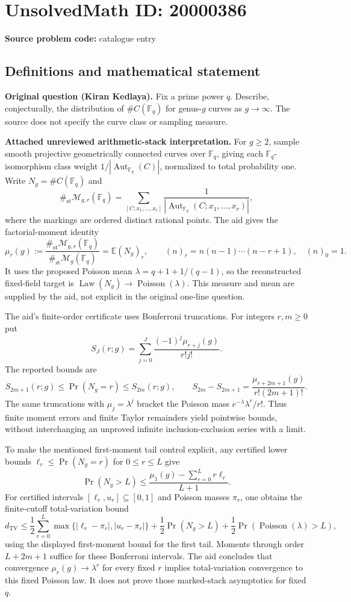\documentclass[11pt]{article}
\newcommand{\F}{\mathbb{F}}
\newcommand{\E}{\mathbb{E}}
\begin{document}
\section*{UnsolvedMath ID: 20000386}
\textbf{Source problem code:} catalogue entry
\subsection{Definitions and mathematical statement}
\textbf{Original question (Kiran Kedlaya).} Fix a prime power $q$. Describe, conjecturally, the distribution of $\#C(\F_q)$ for genus-$g$ curves as $g\to\infty$. The source does not specify the curve class or sampling measure.

\textbf{Attached unreviewed arithmetic-stack interpretation.} For $g\ge2$, sample smooth projective geometrically connected curves over $\F_q$, giving each $\F_q$-isomorphism class weight $1/|\operatorname{Aut}_{\F_q}(C)|$, normalized to total probability one. Write $N_g=\#C(\F_q)$ and
\[\#_{\mathrm{st}}\mathcal M_{g,r}(\F_q)=\sum_{[C;x_1,\ldots,x_r]}\frac1{|\operatorname{Aut}_{\F_q}(C;x_1,\ldots,x_r)|},\]
where the markings are ordered distinct rational points. The aid gives the factorial-moment identity
\[\mu_r(g):=\frac{\#_{\mathrm{st}}\mathcal M_{g,r}(\F_q)}{\#_{\mathrm{st}}\mathcal M_g(\F_q)}=\E (N_g)_r,\qquad (n)_r=n(n-1)\cdots(n-r+1),\quad(n)_0=1.\]
It uses the proposed Poisson mean $\lambda=q+1+1/(q-1)$, so the reconstructed fixed-field target is $\operatorname{Law}(N_g)\to\operatorname{Poisson}(\lambda)$. This measure and mean are supplied by the aid, not explicit in the original one-line question.

The aid's finite-order certificate uses Bonferroni truncations. For integers $r,m\ge0$ put
\[S_J(r;g)=\sum_{j=0}^J\frac{(-1)^j\mu_{r+j}(g)}{r!j!}.\]
The reported bounds are
\[S_{2m+1}(r;g)\le\Pr(N_g=r)\le S_{2m}(r;g),\qquad S_{2m}-S_{2m+1}=\frac{\mu_{r+2m+1}(g)}{r!(2m+1)!}.\]
The same truncations with $\mu_j=\lambda^j$ bracket the Poisson mass $e^{-\lambda}\lambda^r/r!$. Thus finite moment errors and finite Taylor remainders yield pointwise bounds, without interchanging an unproved infinite inclusion-exclusion series with a limit.

To make the mentioned first-moment tail control explicit, any certified lower bounds $\ell_r\le\Pr(N_g=r)$ for $0\le r\le L$ give
\[\Pr(N_g>L)\le\frac{\mu_1(g)-\sum_{r=0}^Lr\ell_r}{L+1}.\]
For certified intervals $[\ell_r,u_r]\subseteq[0,1]$ and Poisson masses $\pi_r$, one obtains the finite-cutoff total-variation bound
\[d_{\mathrm{TV}}\le\frac12\sum_{r=0}^L\max\{|\ell_r-\pi_r|,|u_r-\pi_r|\}+\frac12\Pr(N_g>L)+\frac12\Pr(\operatorname{Poisson}(\lambda)>L),\]
using the displayed first-moment bound for the first tail. Moments through order $L+2m+1$ suffice for these Bonferroni intervals. The aid concludes that convergence $\mu_r(g)\to\lambda^r$ for every fixed $r$ implies total-variation convergence to this fixed Poisson law. It does not prove those marked-stack asymptotics for fixed $q$.
\end{document}
